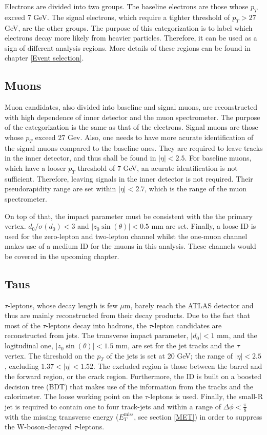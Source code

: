 \documentclass[class=NCU_thesis, crop=false]{standalone}
\begin{document}
		Electrons are divided into two groups. The baseline electrons are those whose $p_T$ exceed 7 GeV. The signal electrons, which require a tighter threshold of $p_T > 27$ GeV, are the other groups. The purpose of this categorization is to label which electrons decay more likely from heavier particles. Therefore, it can be used as a sign of different analysis regions. More details of these regions can be found in chapter \ref{Event selection}.
		
	\subsection{Muons}
		Muon candidates, also divided into baseline and signal muons, are reconstructed with high dependence of inner detector and the muon spectrometer. The purpose of the categorization is the same as that of the electrons. Signal muons are those whose $p_T$ exceed 27 Gev. Also, one needs to have more acurate identification of the signal muons compared to the baseline ones. They are required to leave tracks in the inner detector, and thus shall be found in $\lvert \eta \rvert < 2.5$. For baseline muons, which have a looser $p_T$ threshold of 7 GeV, an acurate identification is not sufficient. Therefore, leaving signals in the inner detector is not required. Their pseudorapidity range are set within $\lvert \eta \rvert < 2.7$, which is the range of the muon spectrometer.
		
		On top of that, the impact parameter must be consistent with the the primary vertex. $d_0 / \sigma(d_0) < 3$ and $\lvert z_0 \sin(\theta) \rvert < 0.5$ mm are set. Finally, a loose ID is used for the zero-lepton and two-lepton channel whilst the one-muon channel makes use of a medium ID for the muons in this analysis. These channels would be covered in the upcoming chapter.
		
	\subsection{Taus}
		$\tau$-leptons, whose decay length is few $\mu$m, barely reach the ATLAS detector and thus are mainly reconstructed from their decay products. Due to the fact that most of the $\tau$-leptons decay into hadrons, the $\tau$-lepton candidates are reconstructed from jets. The transverse impact parameter, $\lvert d_0 \rvert < 1$ mm, and the logitudinal one, $\lvert z_0 \sin(\theta) \rvert < 1.5$ mm, are set for the jet tracks and the $\tau$ vertex. The threshold on the $p_T$ of the jets is set at 20 GeV; the range of $\lvert \eta \rvert < 2.5$, excluding $1.37 < \lvert \eta \rvert < 1.52$. The excluded region is those between the barrel and the forward region, or the crack region. Furthermore, the ID is built on a boosted decision tree (BDT) that makes use of the information from the tracks and the calorimeter. The loose working point on the $\tau$-leptons is used. Finally, the small-R jet is required to contain one to four track-jets and within a range of $\Delta \phi < \frac{\pi}{8}$ with the missing transverse energy ($E_T^{\mathrm{miss}}$, see section \ref{MET}) in order to suppress the W-boson-decayed $\tau$-leptons.
	
\end{document}
